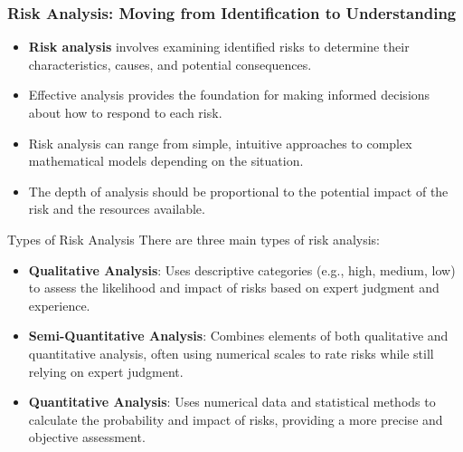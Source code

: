 \documentclass{beamer}
\begin{document}
  \begin{frame}
  \frametitle{Risk Analysis: Moving from Identification to Understanding}
  \begin{itemize}
    \item \textbf{Risk analysis} involves examining identified risks to determine their characteristics, causes, and potential consequences.
    \item Effective analysis provides the foundation for making informed decisions about how to respond to each risk.
    \item Risk analysis can range from simple, intuitive approaches to complex mathematical models depending on the situation.
    \item The depth of analysis should be proportional to the potential impact of the risk and the resources available.
  \end{itemize}
  
  \begin{block}{Types of Risk Analysis}
  There are three main types of risk analysis:
  \scriptsize
  \begin{itemize}
    \item \textbf{Qualitative Analysis}: Uses descriptive categories (e.g., high, medium, low) to assess the likelihood and impact of risks based on expert judgment and experience.
    \item \textbf{Semi-Quantitative Analysis}: Combines elements of both qualitative and quantitative analysis, often using numerical scales to rate risks while still relying on expert judgment.
    \item \textbf{Quantitative Analysis}: Uses numerical data and statistical methods to calculate the probability and impact of risks, providing a more precise and objective assessment.
  \end{itemize}
  \end{block}
  \end{frame}
  
\end{document}
